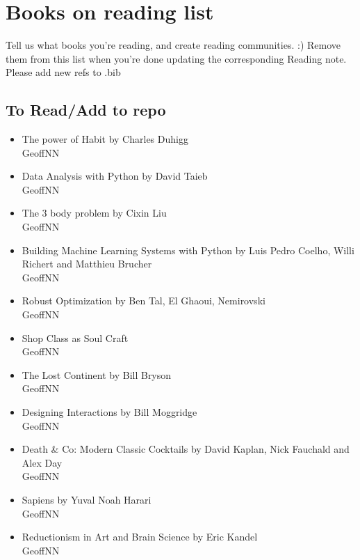 
\section{Books on reading list}
Tell us what books you're reading, and create reading communities. :) Remove them from this list when you're done updating the corresponding Reading note. Please add new refs to .bib

\subsection{To Read/Add to repo}
\begin{itemize}
    \item The power of Habit by Charles Duhigg\\
    GeoffNN
    \item Data Analysis with Python by David Taieb \\
    GeoffNN
    \item The 3 body problem by Cixin Liu\\
    GeoffNN
    \item Building Machine Learning Systems with Python by Luis Pedro Coelho, Willi Richert and Matthieu Brucher \\
    GeoffNN
    \item Robust Optimization by Ben Tal, El Ghaoui, Nemirovski \\
    GeoffNN
    \item Shop Class as Soul Craft \\
    GeoffNN
    \item The Lost Continent by Bill Bryson \\
    GeoffNN
    \item Designing Interactions by Bill Moggridge \\
    GeoffNN
    \item Death \& Co: Modern Classic Cocktails by David Kaplan, Nick Fauchald and Alex Day \\
    GeoffNN
    \item Sapiens by Yuval Noah Harari \\
    GeoffNN
    \item Reductionism in Art and Brain Science by Eric Kandel \\
    GeoffNN
\end{itemize}
